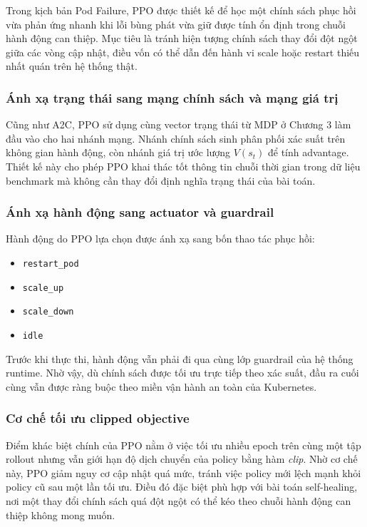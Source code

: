 \noindent Trong kịch bản Pod Failure, PPO được thiết kế để học một chính sách phục hồi vừa phản ứng nhanh khi lỗi bùng phát vừa giữ được tính ổn định trong chuỗi hành động can thiệp. Mục tiêu là tránh hiện tượng chính sách thay đổi đột ngột giữa các vòng cập nhật, điều vốn có thể dẫn đến hành vi scale hoặc restart thiếu nhất quán trên hệ thống thật.

\subsubsection{Ánh xạ trạng thái sang mạng chính sách và mạng giá trị}

\noindent Cũng như A2C, PPO sử dụng cùng vector trạng thái từ MDP ở Chương 3 làm đầu vào cho hai nhánh mạng. Nhánh chính sách sinh phân phối xác suất trên không gian hành động, còn nhánh giá trị ước lượng $V(s_t)$ để tính advantage. Thiết kế này cho phép PPO khai thác tốt thông tin chuỗi thời gian trong dữ liệu benchmark mà không cần thay đổi định nghĩa trạng thái của bài toán.

\subsubsection{Ánh xạ hành động sang actuator và guardrail}

\noindent Hành động do PPO lựa chọn được ánh xạ sang bốn thao tác phục hồi:
\begin{itemize}
    \item \texttt{restart\_pod}
    \item \texttt{scale\_up}
    \item \texttt{scale\_down}
    \item \texttt{idle}
\end{itemize}
\noindent Trước khi thực thi, hành động vẫn phải đi qua cùng lớp guardrail của hệ thống runtime. Nhờ vậy, dù chính sách được tối ưu trực tiếp theo xác suất, đầu ra cuối cùng vẫn được ràng buộc theo miền vận hành an toàn của Kubernetes.

\subsubsection{Cơ chế tối ưu clipped objective}

\noindent Điểm khác biệt chính của PPO nằm ở việc tối ưu nhiều epoch trên cùng một tập rollout nhưng vẫn giới hạn độ dịch chuyển của policy bằng hàm \textit{clip}. Nhờ cơ chế này, PPO giảm nguy cơ cập nhật quá mức, tránh việc policy mới lệch mạnh khỏi policy cũ sau một lần tối ưu. Điều đó đặc biệt phù hợp với bài toán self-healing, nơi một thay đổi chính sách quá đột ngột có thể kéo theo chuỗi hành động can thiệp không mong muốn.

